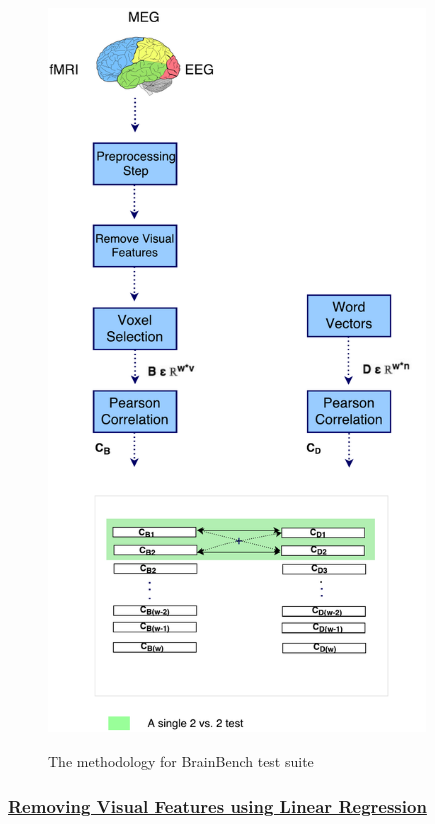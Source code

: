 \begin{figure}[!hb]
\centering
\includegraphics[width=10cm, height=20cm]{Figures/BrainBenchDiagram1}
\caption{The methodology for BrainBench test suite}
\label{BrainBenchMethod}
\end{figure}

\subsubsection{\underline{Removing Visual Features using Linear Regression}}

